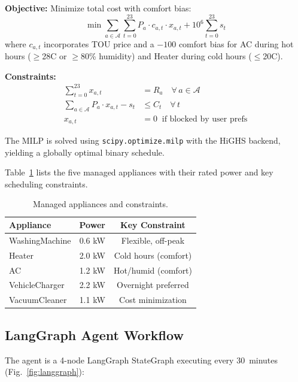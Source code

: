 \documentclass[10pt,a4paper,twocolumn]{article}
\begin{document}
\textbf{Objective:} Minimize total cost with comfort bias:
\begin{equation}
    \min \sum_{a \in \mathcal{A}} \sum_{t=0}^{23} P_a \cdot c_{a,t} \cdot x_{a,t} + 10^6 \sum_{t=0}^{23} s_t
    \label{eq:objective}
\end{equation}
where $c_{a,t}$ incorporates TOU price and a $-100$ comfort bias for AC during hot hours ($\geq$28\textdegree{}C or $\geq$80\% humidity) and Heater during cold hours ($\leq$20\textdegree{}C).

\textbf{Constraints:}
\begin{align}
    \sum_{t=0}^{23} x_{a,t} &= R_a \quad \forall\, a \in \mathcal{A} \label{eq:runtime} \\
    \sum_{a \in \mathcal{A}} P_a \cdot x_{a,t} - s_t &\leq C_t \quad \forall\, t \label{eq:capacity} \\
    x_{a,t} &= 0 \;\; \text{if blocked by user prefs} \label{eq:userprefs}
\end{align}

The MILP is solved using \texttt{scipy.optimize.milp} with the HiGHS backend, yielding a globally optimal binary schedule.

Table~\ref{tab:appliances} lists the five managed appliances with their rated power and key scheduling constraints.

\begin{table}[H]
    \centering
    \caption{Managed appliances and constraints.}
    \label{tab:appliances}
    \small
    \begin{tabular}{@{}lcc@{}}
        \toprule
        \textbf{Appliance} & \textbf{Power} & \textbf{Key Constraint} \\
        \midrule
        WashingMachine & 0.6 kW & Flexible, off-peak \\
        Heater         & 2.0 kW & Cold hours (comfort) \\
        AC             & 1.2 kW & Hot/humid (comfort) \\
        VehicleCharger & 2.2 kW & Overnight preferred \\
        VacuumCleaner  & 1.1 kW & Cost minimization \\
        \bottomrule
    \end{tabular}
\end{table}

\subsection{LangGraph Agent Workflow}
The agent is a 4-node LangGraph StateGraph executing every 30~minutes (Fig.~\ref{fig:langgraph}):
\end{document}
